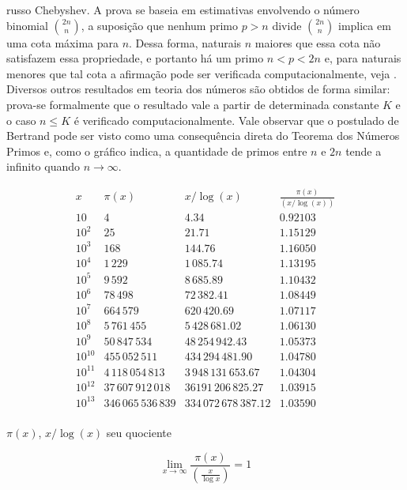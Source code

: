russo Chebyshev. A prova se baseia em estimativas
envolvendo o número binomial ${2n \choose n}$, a suposição
que nenhum primo $p>n$ divide ${2n \choose n}$ implica
em uma cota máxima para $n$. Dessa forma, naturais $n$
maiores que essa cota não satisfazem essa propriedade,
e portanto há um primo $n<p<2n$ e, para naturais menores
que tal cota a afirmação pode ser verificada
computacionalmente, veja \cite[Sec. 5.3]{tnumgugu}.
Diversos outros resultados em teoria dos números são obtidos
de forma similar: prova-se formalmente que o resultado vale 
a partir de determinada constante $K$ e o caso
$n\leq K$ é verificado computacionalmente.
Vale observar que o postulado
de Bertrand pode ser visto como uma consequência direta 
do Teorema dos Números Primos e, como o gráfico 
indica, a quantidade de primos entre $n$ e $2n$
tende a infinito quando $n\to \infty$. 

\begin{table}
$$
\begin{array}{crrr}
x  & \pi(x) & x/\log(x) & \frac{\pi(x)}{(x/\log(x))} \\ \hline
10  & 4 & 4.34 & 0.92103 \\
10^2  & 25 & 21.71 & 1.15129 \\
10^3  & 168 & 144.76 & 1.16050 \\
10^4  & 1\,229 & 1\,085.74 & 1.13195 \\
10^5  & 9\,592 & 8\,685.89 & 1.10432 \\
10^6  & 78\,498 & 72\,382.41 & 1.08449 \\
10^7  & 664\,579 & 620\,420.69 & 1.07117 \\
10^8  & 5\,761\,455 & 5\,428\,681.02 & 1.06130 \\
10^9  & 50\,847\,534 & 48\,254\,942.43 & 1.05373 \\
10^{10}  & 455\,052\,511 & 434\,294\,481.90 & 1.04780 \\
10^{11}  & 4\,118\,054\,813 & 3\,948\,131\,653.67 & 1.04304 \\
10^{12}  & 37\,607\,912\,018 & 36191\,206\,825.27 & 1.03915 \\
10^{13}  & 346\,065\,536\,839 & 334\,072\,678\,387.12 & 1.03590 \\
\end{array}
$$
\caption{$\pi(x)$, $x/\log(x)$  seu quociente}
\label{tab:tnplog}
\end{table}

$$
  \lim_{x \to \infty}
    \frac{\pi(x)}{\left(\frac{x}{\log x}\right)} = 1
$$

